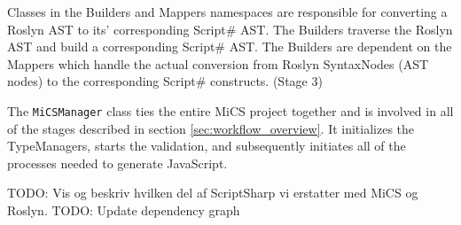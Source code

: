 Classes in the Builders and Mappers namespaces are responsible for converting a Roslyn AST to its' corresponding Script\# AST. The Builders traverse the Roslyn AST and build a corresponding Script\# AST. The Builders are dependent on the Mappers which handle the actual conversion from Roslyn SyntaxNodes (AST nodes) to the corresponding Script\# constructs. (Stage 3)

The \texttt{MiCSManager} class ties the entire MiCS project together and is involved in all of the stages described in section \ref{sec:workflow_overview}. It initializes the TypeManagers, starts the validation, and subsequently initiates all of the processes needed to generate JavaScript. 

TODO: Vis og beskriv hvilken del af ScriptSharp vi erstatter med MiCS og Roslyn.
TODO: Update dependency graph

